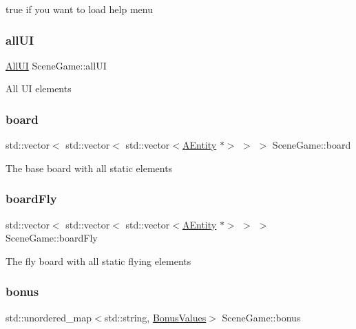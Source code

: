 true if you want to load help menu \mbox{\label{class_scene_game_ae6a927879520686d867eee29aa67663f}} 
\subsubsection{\texorpdfstring{all\+UI}{allUI}}
{\footnotesize\ttfamily \hyperlink{struct_scene_game_1_1_all_u_i}{All\+UI} Scene\+Game\+::all\+UI\hspace{0.3cm}{\ttfamily [protected]}}

All UI elements \mbox{\label{class_scene_game_a2306af8a268c9d476d1060fa3daa1ac5}} 
\subsubsection{\texorpdfstring{board}{board}}
{\footnotesize\ttfamily std\+::vector$<$ std\+::vector$<$ std\+::vector$<$\hyperlink{class_a_entity}{A\+Entity} $\ast$$>$ $>$ $>$ Scene\+Game\+::board}

The base board with all static elements \mbox{\label{class_scene_game_a8abb19247e59048f4f151f28934325ac}} 
\subsubsection{\texorpdfstring{board\+Fly}{boardFly}}
{\footnotesize\ttfamily std\+::vector$<$ std\+::vector$<$ std\+::vector$<$\hyperlink{class_a_entity}{A\+Entity} $\ast$$>$ $>$ $>$ Scene\+Game\+::board\+Fly}

The fly board with all static flying elements \mbox{\label{class_scene_game_a9d05f8167666796932daca9d06ed62d1}} 
\subsubsection{\texorpdfstring{bonus}{bonus}}
{\footnotesize\ttfamily std\+::unordered\+\_\+map$<$std\+::string, \hyperlink{struct_scene_game_1_1_bonus_values}{Bonus\+Values}$>$ Scene\+Game\+::bonus}

